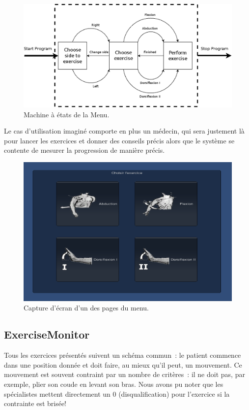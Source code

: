 \begin{figure}[h!]
\centering
\includegraphics[width=\linewidth]{images/menu}
\caption{Machine à états de la Menu.}
\end{figure}

Le cas d'utilisation imaginé comporte en plus un médecin, qui sera justement là
pour lancer les exercices et donner des conseils précis alors que le système 
se contente de mesurer la progression de manière précis.

\begin{figure}[h!]
\centering
\includegraphics[width=0.8\linewidth]{images/menu2}
\caption{Capture d'écran d'un des pages du menu.}
\end{figure}
    

\subsection{ExerciseMonitor}

Tous les exercices présentés suivent un schéma commun~: le patient commence dans
une position donnée et doit faire, au mieux qu'il peut, un mouvement. Ce mouvement
est souvent contraint par un nombre de critères~: il ne doit pas, par exemple,
plier son coude en levant son bras. Nous avons pu noter que les spécialistes 
mettent directement un 0
(disqualification) pour l'exercice si la contrainte est brisée!

